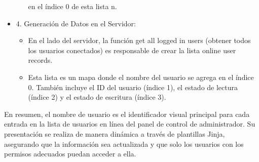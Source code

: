 \documentclass{report}
\begin{document}
\begin{itemize}
\begin{itemize}
            en el índice 0 de esta lista n.        
        \end{itemize}
    \item 4. Generación de Datos en el Servidor:
        \begin{itemize}
            \item En el lado del servidor, la función get all logged in users (obtener todos los usuarios conectados) es responsable de crear 
            la lista online user records.
            \item Esta lista es un mapa donde el nombre del usuario se agrega en el índice 0. También incluye el ID del usuario (índice 1), 
            el estado de lectura (índice 2) y el estado de escritura (índice 3).
        \end{itemize}
\end{itemize}
En resumen, el nombre de usuario es el identificador visual principal para cada entrada en la lista de usuarios en línea del panel de 
control de administrador. Su presentación se realiza de manera dinámica a través de plantillas Jinja, asegurando que la información 
sea actualizada y que solo los usuarios con los permisos adecuados puedan acceder a ella.
\end{document}
